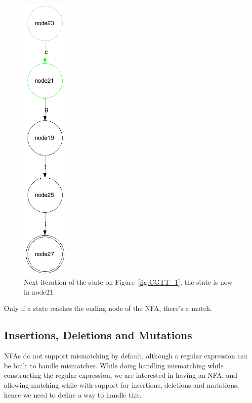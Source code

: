 \begin{figure}[h!]
\begin{minipage}[b]{0.40\linewidth}
\includegraphics[width=0.2\textwidth]{lib/cgtt2.png}
 \caption{Next iteration of the state on Figure~\ref{fig:CGTT_1}, the state is now in node21.}
    \end{minipage}
\label{fig::cgtt}
\end{figure}

Only if a state reaches the ending node of the NFA, there's a match.

\newpage

\subsection{Insertions, Deletions and Mutations}
NFAs do not support mismatching by default, although a regular expression can be built to handle mismatches. While doing handling mismatching while constructing the regular expression, we are interested in having an NFA, and allowing matching while with support for insertions, deletions and mutations, hence we need to define a way to handle this.

